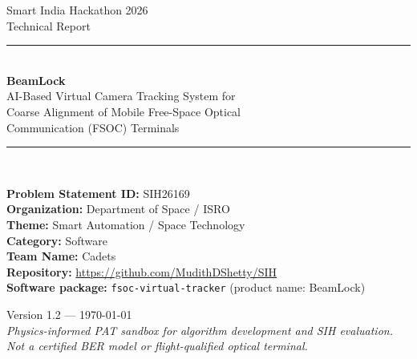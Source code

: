 \documentclass[11pt,a4paper]{article}
\begin{document}
\begin{titlepage}
\centering
\vspace*{0.8cm}
{\color{BeamMuted}\large Smart India Hackathon 2026}\\[0.35cm]
{\color{BeamTeal}\Large Technical Report}\\[0.9cm]
{\rule{\textwidth}{1.2pt}}\\[0.45cm]
{\LARGE\bfseries\color{BeamInk} BeamLock}\\[0.3cm]
{\large AI-Based Virtual Camera Tracking System for\\
Coarse Alignment of Mobile Free-Space Optical\\
Communication (FSOC) Terminals}\\[0.45cm]
{\rule{\textwidth}{1.2pt}}\\[1.0cm]

\begin{minipage}{0.88\textwidth}
\raggedright
\textbf{Problem Statement ID:} SIH26169\\[0.2cm]
\textbf{Organization:} Department of Space / ISRO\\[0.2cm]
\textbf{Theme:} Smart Automation / Space Technology\\[0.2cm]
\textbf{Category:} Software\\[0.2cm]
\textbf{Team Name:} Cadets\\[0.2cm]
\textbf{Repository:} \url{https://github.com/MudithDShetty/SIH}\\[0.2cm]
\textbf{Software package:} \texttt{fsoc-virtual-tracker} (product name: BeamLock)
\end{minipage}

\vfill
{\large Version 1.2 --- \today}\\[0.45cm]
{\small\textit{Physics-informed PAT sandbox for algorithm development and SIH evaluation.\\
Not a certified BER model or flight-qualified optical terminal.}}
\end{titlepage}

\begin{abstract}
\noindent
This report documents \textbf{BeamLock}, an AI-assisted virtual camera tracking system developed for SIH26169.
The software closes a real-time coarse pointing--acquisition--tracking (PAT) loop inside a configurable virtual scene: moving optical beacons, an azimuth/elevation (AZ/EL) virtual camera plant with rate limits, Classical and hybrid AI detectors, constant-velocity Kalman tracking, covariance-scaled raster re-acquisition, disturbance injection, and automated performance logging.
\textbf{Section~\ref{sec:compliance} explicitly traces every SIH26169 expected-solution prerequisite, Parameters-table item, evaluation path, and submission deliverable to implemented evidence}, and additionally lists beyond-PS capabilities (physics channel, Link Readiness Fine handoff, Monte Carlo, dual Physics/PS profiles).
Verified matched-seed Classical vs AI results, acquisition Monte Carlo against an ESTOL-inspired $60\,\mathrm{s}$ bound, and representative HUD captures are reported with honest limitations (notably slew-lag-limited mean pixel error in the physics closed loop).
\end{abstract}
\end{document}
